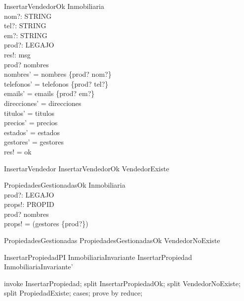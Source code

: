 \begin{schema}{InsertarVendedorOk}
\Delta Inmobiliaria \\
nom?: STRING \\
tel?: STRING \\
em?: STRING \\
prod?: LEGAJO \\
res!: msg \\
\where
prod? \notin \dom nombres \\

nombres' =  nombres \cup \{prod? \mapsto nom?\}  \\
telefonos' =  telefonos \cup \{prod? \mapsto tel?\}  \\
emails' =  emails \cup \{prod? \mapsto em?\}  \\

direcciones' =  direcciones\\
titulos' = titulos\\
precios' = precios\\
estados' = estados\\
gestores' = gestores\\

res! = ok \\
\end{schema}

\begin{zed}
InsertarVendedor  InsertarVendedorOk \lor VendedorExiste
\end{zed}

\begin{schema}{PropiedadesGestionadasOk}
\Xi Inmobiliaria \\
prod?: LEGAJO \\
props!: \power PROPID \\
\where
prod? \in \dom nombres \\
props! = \dom(gestores \rres \{prod?\})
\end{schema}

\begin{zed}
PropiedadesGestionadas  PropiedadesGestionadasOk \lor VendedorNoExiste
\end{zed}

\begin{theorem}{InsertarPropiedadPI}
InmobiliariaInvariante \land InsertarPropiedad \implies InmobiliariaInvariante'
\end{theorem}

\begin{zproof}[InsertarPropiedadPI]
invoke InsertarPropiedad;
split InsertarPropiedadOk;
split VendedorNoExiste;
split PropiedadExiste;
cases;
prove by reduce;
\end{zproof}